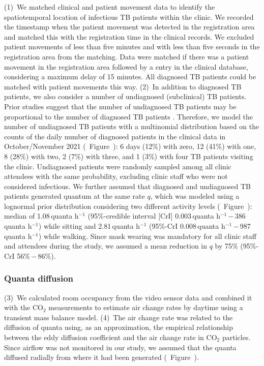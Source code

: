 \documentclass[fleqn,11pt]{wlscirep}
\begin{document}
(1)~We matched clinical and patient movement data to identify the spatiotemporal location of infectious TB patients within the clinic. We recorded the timestamp when the patient movement was detected in the registration area and matched this with the registration time in the clinical records. We excluded patient movements of less than five minutes and with less than five seconds in the registration area from the matching. Data were matched if there was a patient movement in the registration area followed by a entry in the clinical database, considering a maximum delay of 15 minutes. All diagnosed TB patients could be matched with patient movements this way. (2)~In addition to diagnosed TB patients, we also consider a number of undiagnosed (subclinical) TB patients. Prior studies suggest that the number of undiagnosed TB patients may be proportional to the number of diagnosed TB patients \cite{Berhanu2023CID,Moyo2022LancetID,Patterson2024PNAS}. Therefore, we model the number of undiagnosed TB patients with a multinomial distribution based on the counts of the daily number of diagnosed patients in the clinical data in October/November 2021 (\supp~Figure~): 6 days (12\%) with zero, 12 (41\%) with one, 8 (28\%) with two, 2 (7\%) with three, and 1 (3\%) with four TB patients visiting the clinic. Undiagnosed patients were randomly sampled among all clinic attendees with the same probability, excluding clinic staff who were not considered infectious. We further assumed that diagnosed and undiagnosed TB patients generated quantum at the same rate $q$, which was modeled using a lognormal prior distribution considering two different activity levels (\supp~Figure~): median of 1.08\,quanta h$^{-1}$ (95\%-credible interval [CrI] 0.003\,quanta h$^{-1}$\,$-$\,386\,quanta h$^{-1}$) while sitting and 2.81\,quanta h$^{-1}$ (95\%-CrI 0.008\,quanta h$^{-1}$\,$-$\,987\,quanta h$^{-1}$) while walking\cite{Mikszewski2021GF,Buonanno2020EI,Banholzer2024PGPH}. Since mask wearing was mandatory for all clinic staff and attendees during the study, we assumed a mean reduction in $q$ by 75\% (95\%-CrI 56\%\,$-$\,86\%)\cite{Dharmadhikari2012AJRCCM,McCreesh2021BMJGlobalHealth}.

\subsubsection*{Quanta diffusion}

(3)~We calculated room occupancy from the video sensor data and combined it with the CO$_2$ measurements to estimate air change rates by daytime using a transient mass balance model\cite{Batterman2017IJERPH}. (4)~The air change rate was related to the diffusion of quanta using, as an approximation, the empirical relationship between the eddy diffusion coefficient and the air change rate in CO$_2$ particles\cite{Cheng2011EnvSciTech,Foat2020BE}. Since airflow was not monitored in our study, we assumed that the quanta diffused radially from where it had been generated (\supp~Figure~). 
\end{document}
